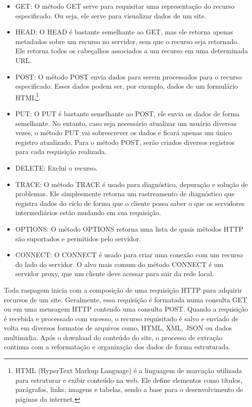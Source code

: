 \documentclass[
  12pt,
  a4paper,
]{scrreprt}
\begin{document}
\begin{itemize}
\item
  GET: O método GET serve para requisitar uma representação do recurso
  especificado. Ou seja, ele serve para visualizar dados de um site.
\item
  HEAD: O HEAD é bastante semelhante ao GET, mas ele retorna apenas
  metadados sobre um recurso no servidor, sem que o recurso seja
  retornado. Ele retorna todos os cabeçalhos associados a um recurso em
  uma determinada URL.
\item
  POST: O método POST envia dados para serem processados para o recurso
  especificado. Esses dados podem ser, por exemplo, dados de um
  formulário HTML\footnote{HTML (HyperText Markup Language) é a
    linguagem de marcação utilizada para estruturar e exibir conteúdo na
    web. Ele define elementos como títulos, parágrafos, links, imagens e
    tabelas, sendo a base para o desenvolvimento de páginas da internet.}.
\item
  PUT: O PUT é bastante semelhante ao POST, ele envia os dados de forma
  semelhante. No entanto, caso seja necessário atualizar um usuário
  diversas vezes, o método PUT vai sobrescrever os dados e ficará apenas
  um único registro atualizado. Para o método POST, serão criados
  diversos registros para cada requisição realizada.
\item
  DELETE: Exclui o recurso.
\item
  TRACE: O método TRACE é usado para diagnóstico, depuração e solução de
  problemas. Ele simplesmente retorna um rastreamento de diagnóstico que
  registra dados do ciclo de forma que o cliente possa saber o que os
  servidores intermediários estão mudando em sua requisição.
\item
  OPTIONS: O método OPTIONS retorna uma lista de quais métodos HTTP são
  suportados e permitidos pelo servidor.
\item
  CONNECT: O CONNECT é usado para criar uma conexão com um recurso do
  lado do servidor. O alvo mais comum do método CONNECT é um servidor
  proxy, que um cliente deve acessar para sair da rede local.
\end{itemize}

Toda raspagem inicia com a composição de uma requisição HTTP para
adquirir recursos de um site. Geralmente, essa requisição é formatada
numa consulta GET ou em uma mensagem HTTP contendo uma consulta POST.
Quando a requisição é recebida e processado com sucesso, o recurso
requisitado é salvo e enviado de volta em diversos formatos de arquivos
como, HTML, XML, JSON ou dados multímidia. Após o download do conteúdo
do site, o processo de extração continua com a reformatação e
organização dos dados de forma estruturada.
\end{document}
